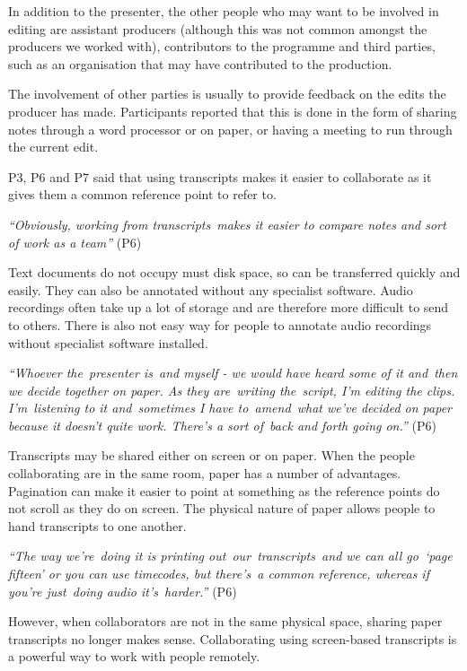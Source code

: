 In addition to the presenter, the other people who may want to be involved in editing are assistant producers (although
this was not common amongst the producers we worked with), contributors to the programme and third parties, such as an
organisation that may have contributed to the production.

The involvement of other parties is usually to provide feedback on the edits the producer has made. Participants
reported that this is done in the form of sharing notes through a word processor or on paper, or having a meeting to
run through the current edit.


P3, P6 and P7 said that using transcripts makes it easier to collaborate as it gives them a common reference point to
refer to.

\textit{``Obviously, working from transcripts makes it easier to compare notes and sort of work as a team''} (P6)

Text documents do not occupy must disk space, so can be transferred quickly and easily.
They can also be annotated without any specialist software. Audio recordings often take up a lot of storage and are
therefore more difficult to send to others. There is also not easy way for people to annotate audio recordings without
specialist software installed.

\textit{``Whoever the presenter is and myself - we would have heard some of it and then we decide together on paper. As
  they are writing the script, I'm editing the clips. I'm listening to it and sometimes I have to amend what we've
decided on paper because it doesn't quite work. There's a sort of back and forth going on.''} (P6)


Transcripts may be shared either on screen or on paper. When the people collaborating are in the same room, paper has a
number of advantages. Pagination can make it easier to point at something as the reference points do not scroll as they
do on screen. The physical nature of paper allows people to hand transcripts to one another.

\textit{``The way we're doing it is printing out our transcripts and we can all go `page fifteen' or you can
use timecodes, but there's a common reference, whereas if you're just doing audio it's harder.''} (P6)

However, when collaborators are not in the same physical space, sharing paper transcripts no longer makes sense.
Collaborating using screen-based transcripts is a powerful way to work with people remotely.

